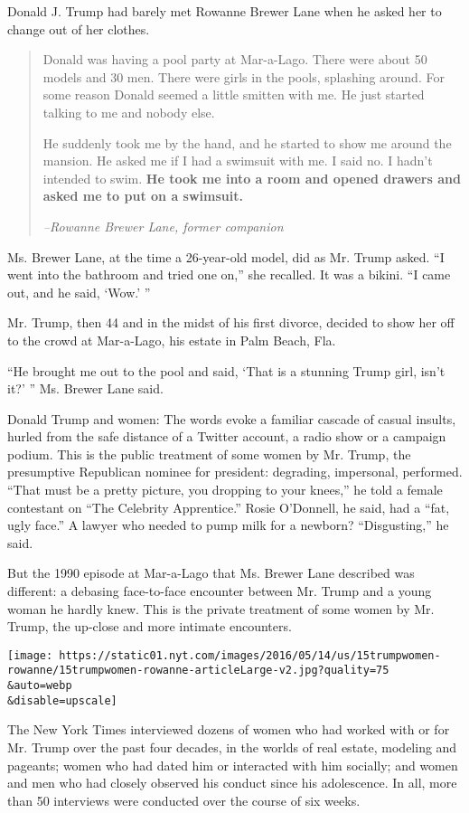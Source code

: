 Donald J. Trump had barely met Rowanne Brewer Lane when he asked her to
change out of her clothes.

\begin{quote}
Donald was having a pool party at Mar-a-Lago. There were about 50 models
and 30 men. There were girls in the pools, splashing around. For some
reason Donald seemed a little smitten with me. He just started talking
to me and nobody else.

He suddenly took me by the hand, and he started to show me around the
mansion. He asked me if I had a swimsuit with me. I said no. I hadn't
intended to swim. \textbf{He took me into a room and opened drawers and
asked me to put on a swimsuit.}

\emph{--Rowanne Brewer Lane, former companion}
\end{quote}

Ms. Brewer Lane, at the time a 26-year-old model, did as Mr. Trump
asked. ``I went into the bathroom and tried one on,'' she recalled. It
was a bikini. ``I came out, and he said, `Wow.' ''

Mr. Trump, then 44 and in the midst of his first divorce, decided to
show her off to the crowd at Mar-a-Lago, his estate in Palm Beach, Fla.

``He brought me out to the pool and said, `That is a stunning Trump
girl, isn't it?' '' Ms. Brewer Lane said.

Donald Trump and women: The words evoke a familiar cascade of casual
insults, hurled from the safe distance of a Twitter account, a radio
show or a campaign podium. This is the public treatment of some women by
Mr. Trump, the presumptive Republican nominee for president: degrading,
impersonal, performed. ``That must be a pretty picture, you dropping to
your knees,'' he told a female contestant on ``The Celebrity
Apprentice.'' Rosie O'Donnell, he said, had a ``fat, ugly face.'' A
lawyer who needed to pump milk for a newborn? ``Disgusting,'' he said.

But the 1990 episode at Mar-a-Lago that Ms. Brewer Lane described was
different: a debasing face-to-face encounter between Mr. Trump and a
young woman he hardly knew. This is the private treatment of some women
by Mr. Trump, the up-close and more intimate encounters.

\texttt{[image: https://static01.nyt.com/images/2016/05/14/us/15trumpwomen-rowanne/15trumpwomen-rowanne-articleLarge-v2.jpg?quality=75\\\&auto=webp\\\&disable=upscale]}

The New York Times interviewed dozens of women who had worked with or
for Mr. Trump over the past four decades, in the worlds of real estate,
modeling and pageants; women who had dated him or interacted with him
socially; and women and men who had closely observed his conduct since
his adolescence. In all, more than 50 interviews were conducted over the
course of six weeks.

